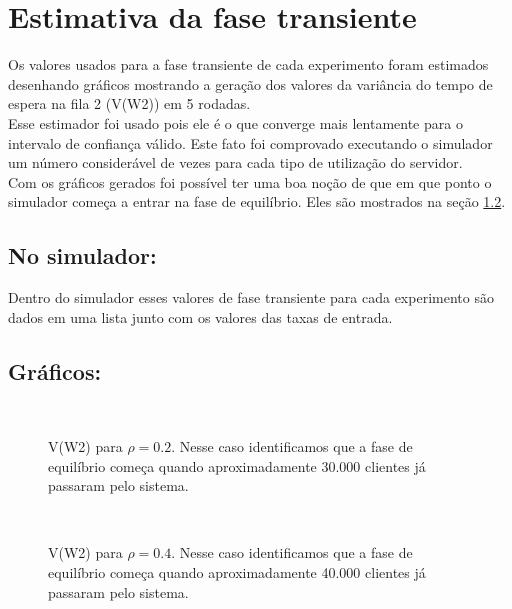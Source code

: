 \chapter{Estimativa da fase transiente}
\label{chap:estimativa}

Os valores usados para a fase transiente de cada experimento foram estimados desenhando gráficos mostrando a geração dos valores da variância do tempo de espera na fila 2 (V(W2)) em 5 rodadas.\\

Esse estimador foi usado pois ele é o que converge mais lentamente para o intervalo de confiança válido. Este fato foi comprovado executando o simulador um número considerável de vezes para cada tipo de utilização do servidor.\\

Com os gráficos gerados foi possível ter uma boa noção de que em que ponto o simulador começa a entrar na fase de equilíbrio. Eles são mostrados na seção \ref{sec:graficos}.\\

\section{No simulador:}

Dentro do simulador esses valores de fase transiente para cada experimento são dados em uma lista junto com os valores das taxas de entrada.

\section{Gráficos:}
\label{sec:graficos}

\begin{figure}[htb!]
    \\
   \caption{V(W2) para $\rho=0.2$. Nesse caso identificamos que a fase de equilíbrio começa quando aproximadamente 30.000 clientes já passaram pelo sistema.}
\end{figure}

\begin{figure}[htb!]
    \\
   \caption{V(W2) para $\rho=0.4$. Nesse caso identificamos que a fase de equilíbrio começa quando aproximadamente 40.000 clientes já passaram pelo sistema.}
\end{figure}

